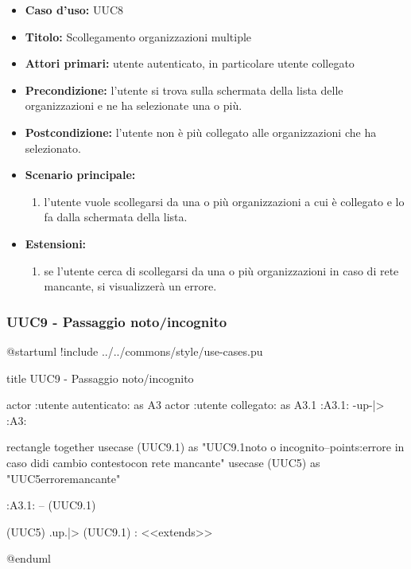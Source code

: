 \documentclass[casi-duso]{subfiles}
\begin{document}
\begin{itemize}
  \item \textbf{Caso d’uso:} UUC8
  \item \textbf{Titolo:} Scollegamento organizzazioni multiple
  \item \textbf{Attori primari:} utente autenticato, in particolare utente collegato
  \item \textbf{Precondizione:} l'utente si trova sulla schermata della lista delle organizzazioni e ne ha selezionate una o più.
  \item \textbf{Postcondizione:} l'utente non è più collegato alle organizzazioni che ha selezionato.
  \item \textbf{Scenario principale:}
        \begin{enumerate}
          \item l'utente vuole scollegarsi da una o più organizzazioni a cui è collegato e lo fa dalla schermata della lista.
        \end{enumerate}
  \item \textbf{Estensioni:}
        \begin{enumerate}
          \item se l'utente cerca di scollegarsi da una o più organizzazioni in caso di rete mancante, si visualizzerà un errore.
        \end{enumerate}
\end{itemize}

\subsubsection{UUC9 - Passaggio noto/incognito}%
\label{subsub:UUC9utente}

\begin{plantuml}
@startuml
!include ../../commons/style/use-cases.pu

title UUC9 - Passaggio noto/incognito

actor :utente autenticato: as A3
actor :utente collegato: as A3.1
:A3.1: -up-|> :A3:

rectangle {
  together {
    usecase (UUC9.1) as "UUC9.1\nScelta noto o incognito\n--\nExtension points:\nVisualizzazione errore in caso di\noperazione di cambio contesto\n con rete mancante"
    usecase (UUC5) as "UUC5\nVisualizzazione errore\nrete mancante"
  }
}

:A3.1: -- (UUC9.1)

(UUC5) .up.|> (UUC9.1) : <<extends>>

@enduml
\end{plantuml}
\end{document}
